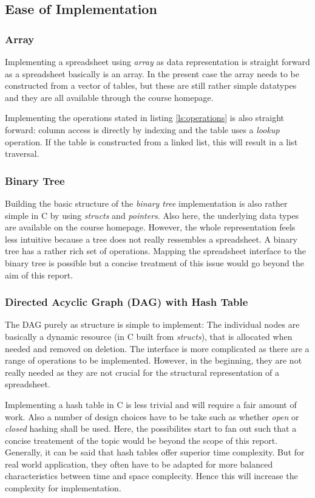 \documentclass[a4paper,11pt,twoside]{article}
\begin{document}
\subsection{Ease of Implementation}
\subsubsection{Array}
Implementing a spreadsheet using \textit{array} as data representation
is straight forward as a spreadsheet basically is an array. In the
present case the array needs to be constructed from a vector of
tables, but these are still rather simple datatypes and they are all
available through the course homepage.

Implementing the operations stated in listing \ref{ls:operations}
is also straight forward: column access is directly by indexing and
the table uses a \textit{lookup} operation. If the table is
constructed from a linked list, this will result in a list traversal. 



\subsubsection{Binary Tree}
Building the basic structure of the \textit{binary tree}
implementation is also rather simple in C by using \textit{structs}
and \textit{pointers}. Also here, the underlying data
types are available on the course homepage. However, the whole
representation feels less intuitive because a tree does not really
ressembles a spreadsheet. A binary tree has a rather rich set of
operations. Mapping the spreadsheet interface to the binary tree is
possible but a concise treatment of this issue would go beyond the aim
of this report.


\subsubsection{Directed Acyclic Graph (DAG) with Hash Table}
The DAG purely as structure is simple to implement: The individual
nodes are basically a dynamic resource (in C built from
\textit{structs}),  that is allocated when needed and removed on
deletion. The interface is more complicated as there are a range of
operations to be implemented. However, in the beginning, they are not
really needed as they are not crucial for the structural
representation of a spreadsheet.

Implementing a hash table in C is less trivial and will require a fair
amount of work. Also a number of design choices have to be take such
as whether \textit{open} or \textit{closed} hashing shall be
used. Here, the possibilites start to fan out such that a concise
treatement of the topic would be beyond the scope of this
report. Generally, it can be said that hash tables offer superior time
complexity. But for real world application, they often have to be
adapted for more balanced characteristics between time and space
complecity. Hence this will increase the complexity for implementation.
\end{document}
